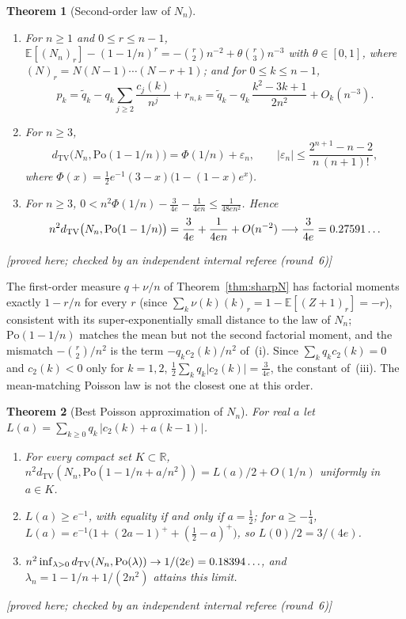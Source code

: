\documentclass[11pt,a4paper]{article}
\theoremstyle{plain}
\newtheorem{theorem}{Theorem}[section]
\theoremstyle{definition}
\theoremstyle{remark}
\newcommand{\R}{\mathbb{R}}
\newcommand{\status}[1]{\textsf{\small [#1]}}
\begin{document}
\begin{theorem}[Second-order law of $N_n$]\label{thm:secondN}
\begin{enumerate}[label=(\roman*),leftmargin=2em]
\item For $n\ge1$ and $0\le r\le n-1$, $\mathbb E[(N_n)_r]-(1-1/n)^r=-\binom r2n^{-2}+\theta\binom r3n^{-3}$ with $\theta\in[0,1]$, where $(N)_r=N(N-1)\cdots(N-r+1)$; and for $0\le k\le n-1$,
\[
p_k=\tilde q_k-q_k\sum_{j\ge2}\frac{c_j(k)}{n^{j}}+r_{n,k}=\tilde q_k-q_k\,\frac{k^2-3k+1}{2n^2}+O_k(n^{-3}).
\]
\item For $n\ge3$,
\[
d_{\mathrm{TV}}\bigl(N_n,\mathrm{Po}(1-1/n)\bigr)=\Phi(1/n)+\varepsilon_n,\qquad
|\varepsilon_n|\le\frac{2^{n+1}-n-2}{n\,(n+1)!},
\]
where $\Phi(x)=\tfrac12e^{-1}(3-x)\bigl(1-(1-x)e^{x}\bigr)$.
\item For $n\ge3$, $0<n^2\Phi(1/n)-\frac3{4e}-\frac1{4en}\le\frac1{48en^2}$. Hence
\[
n^2d_{\mathrm{TV}}\bigl(N_n,\mathrm{Po}(1-1/n)\bigr)=\frac3{4e}+\frac1{4en}+O(n^{-2})\longrightarrow\frac3{4e}=0.27591\ldots
\]
\end{enumerate}
\status{proved here; checked by an independent internal referee (round~6)}
\end{theorem}

\noindent The first-order measure $q+\nu/n$ of Theorem~\ref{thm:sharpN} has factorial moments exactly $1-r/n$ for every $r$ (since $\sum_k\nu(k)(k)_r=1-\mathbb E[(Z+1)_r]=-r$), consistent with its super-exponentially small distance to the law of $N_n$; $\mathrm{Po}(1-1/n)$ matches the mean but not the second factorial moment, and the mismatch $-\binom r2/n^2$ is the term $-q_kc_2(k)/n^2$ of~(i). Since $\sum_kq_kc_2(k)=0$ and $c_2(k)<0$ only for $k=1,2$, $\tfrac12\sum_kq_k|c_2(k)|=\tfrac3{4e}$, the constant of~(iii). The mean-matching Poisson law is not the closest one at this order.

\begin{theorem}[Best Poisson approximation of $N_n$]\label{thm:bestpois}
For real $a$ let $L(a)=\sum_{k\ge0}q_k\,|c_2(k)+a(k-1)|$.
\begin{enumerate}[label=(\roman*),leftmargin=2em]
\item For every compact set $K\subset\R$, $n^2d_{\mathrm{TV}}(N_n,\mathrm{Po}(1-1/n+a/n^2))=L(a)/2+O(1/n)$ uniformly in $a\in K$.
\item $L(a)\ge e^{-1}$, with equality if and only if $a=\tfrac12$; for $a\ge-\tfrac14$, $L(a)=e^{-1}\bigl(1+(2a-1)^++(\tfrac12-a)^+\bigr)$, so $L(0)/2=3/(4e)$.
\item $n^2\inf_{\lambda>0}d_{\mathrm{TV}}(N_n,\mathrm{Po}(\lambda))\to1/(2e)=0.18394\ldots$, and $\lambda_n=1-1/n+1/(2n^2)$ attains this limit.
\end{enumerate}
\status{proved here; checked by an independent internal referee (round~6)}
\end{theorem}
\end{document}
